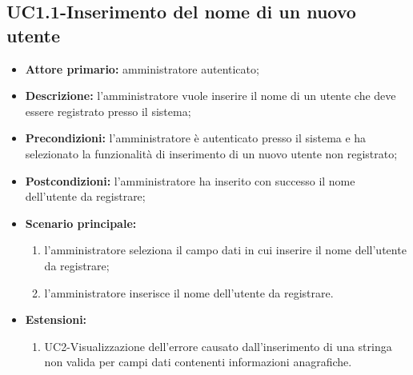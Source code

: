 \subsection{UC1.1-Inserimento del nome di un nuovo utente}
\begin{itemize}
	\item \textbf{Attore primario:} amministratore autenticato;

	\item \textbf{Descrizione:} l'amministratore vuole inserire il nome di un utente che deve essere registrato presso il sistema;

	\item \textbf{Precondizioni:} l'amministratore è autenticato presso il sistema e ha selezionato la funzionalità di inserimento di un nuovo utente non registrato;

	\item \textbf{Postcondizioni:} l'amministratore ha inserito con successo il nome dell'utente da registrare;

	\item \textbf{Scenario principale:}
		\begin{enumerate}
   			 \item l'amministratore seleziona il campo dati in cui inserire il nome dell'utente da registrare;
   			 \item l'amministratore inserisce il nome dell'utente da registrare.
		\end{enumerate}
	\item \textbf{Estensioni:}
		\begin{enumerate}
   			 \item UC2-Visualizzazione dell'errore causato dall'inserimento di una stringa non valida per campi dati contenenti informazioni anagrafiche.
		\end{enumerate}
\end{itemize}
